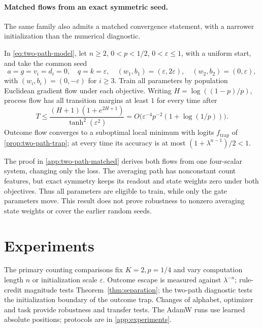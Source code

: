 \paragraph{Matched flows from an exact symmetric seed.}
The same family also admits a matched convergence statement, with a narrower
initialization than the numerical diagnostic.
\begin{proposition}
\label{prop:two-path-matched}
In \cref{eq:two-path-model}, let $n\ge2$, $0<p<1/2$, $0<\varepsilon\le1$,
with a uniform start, and take the common seed
\[
 a=g=v_i=d_i=0,\quad q=k=\varepsilon,\quad
 (w_1,b_1)=(\varepsilon,2\varepsilon),\quad (w_2,b_2)=(0,\varepsilon),
\]
with $(w_i,b_i)=(0,-\varepsilon)$ for $i\ge3$.
Train all parameters by population Euclidean gradient flow under each objective.
Writing $H=\log((1-p)/p)$, process flow has all transition margins at least $1$
for every time after
\[
 T\le \frac{(H+1)(1+e^{2H+1})}{\tanh^2(\varepsilon^2)}
 =O\bigl(\varepsilon^{-4}p^{-2}(1+\log(1/p))\bigr).
\]
Outcome flow converges to a suboptimal local minimum with logits
$f_{\mathrm{trap}}$ of \cref{prop:two-path-trap}; at every time its accuracy is
at most $(1+\lambda^{n-1})/2<1$.
\end{proposition}
The proof in \cref{app:two-path-matched} derives both flows from one four-scalar
system, changing only the loss. The averaging path has nonconstant count features,
but exact symmetry keeps its readout and state weights zero under both objectives.
Thus all parameters are eligible to train, while only the gate parameters move.
This result does not prove robustness to nonzero averaging state weights or
cover the earlier random seeds.

\suppressfloats[t]
\section{Experiments}
\label{sec:experiments}
\label{sec:validation}

The primary counting comparisons fix $K=2,p=1/4$ and vary computation length
$n$ or initialization scale $\varepsilon$. Outcome escape is measured against
$\lambda^{-n}$; rule-credit magnitude tests Theorem~\ref{thm:separation};
the two-path diagnostic tests the initialization boundary of the outcome trap.
Changes of alphabet, optimizer and task provide robustness and transfer tests. The AdamW runs use
learned absolute positions; protocols are in \cref{app:experiments}.

